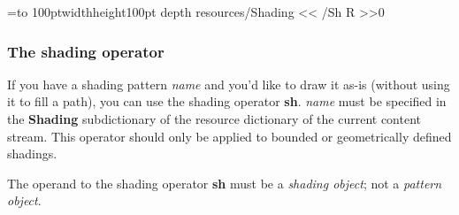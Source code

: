 \immediate{}

\immediate{}

\bgroup
{}=\hbox to 100pt{\vrule width\z@ height100pt depth\z@%
    \hfil%
}
\pdfxform resources{/Shading << /Sh \the\pdflastobj{} R >>}0

\centerline{\pdfrefxform\pdflastxform}
\egroup

\subsubsection{The shading operator}

If you have a shading pattern {\it name} and you'd like to draw it as-is (without using it to fill a path),
you can use the shading operator {\bf sh}.
{\it name} must be specified in the {\bf Shading} subdictionary of the resource dictionary of the current
content stream.
This operator should only be applied to bounded or geometrically defined shadings.

\bnote
    The operand to the shading operator {\bf sh} must be a {\it shading object}; not a {\it pattern object}.
\eppbox

